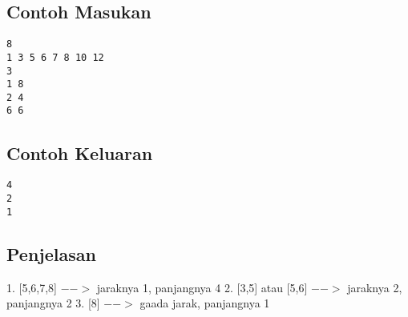 \documentclass{article}
\begin{document}
\begin{multicols}{2}
\subsection*{Contoh Masukan}
\begin{lstlisting}
8
1 3 5 6 7 8 10 12
3
1 8
2 4
6 6
\end{lstlisting}
\columnbreak
\subsection*{Contoh Keluaran}
\begin{lstlisting}
4
2
1
\end{lstlisting}
\vfill
\null
\end{multicols}

\subsection*{Penjelasan}
1. [5,6,7,8] $-->$ jaraknya 1, panjangnya 4
2. [3,5] atau [5,6] $-->$ jaraknya 2, panjangnya 2
3. [8] $-->$ gaada jarak, panjangnya 1


\pagebreak
\end{document}
